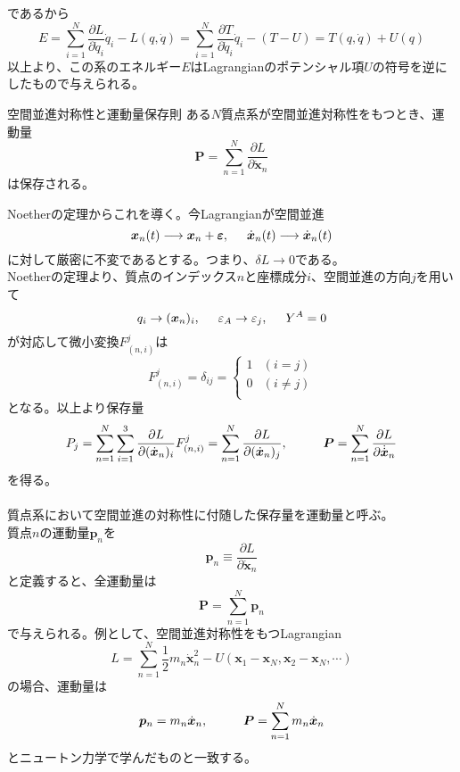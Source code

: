 \documentclass{jsarticle}
\begin{document}
であるから
\[
    E=\sum_{i=1}^{N}\frac{\partial L}{\partial\dot{q}_{i}}\dot{q}_{i}-L(q,\dot{q})
    =\sum_{i=1}^{N}\frac{\partial T}{\partial\dot{q}_{i}}\dot{q}_{i}-(T-U)
    =T(q,\dot{q})+U(q)
\]
以上より、この系のエネルギー\(E\)はLagrangianのポテンシャル項\(U\)の符号を逆にしたもので与えられる。\\
\begin{itembox}[l]{空間並進対称性と運動量保存則}
    ある\(N\)質点系が空間並進対称性をもつとき、運動量
    \[\bm{P}=\sum_{n=1}^{N}\frac{\partial L}{\partial\dot{\bm{x}}_{n}}\]
    は保存される。
\end{itembox}
Noetherの定理からこれを導く。今Lagrangianが空間並進\\
\[\bm{x}_{n}(t)\longrightarrow\bm{x}_{n}+\bm{\varepsilon},\hspace{5mm}
\dot{\bm{x}}_{n}(t)\longrightarrow\dot{\bm{x}}_{n}(t)\]
に対して厳密に不変であるとする。つまり、\(\delta L\to0\)である。\\
Noetherの定理より、質点のインデックス\(n\)と座標成分\(i\)、空間並進の方向\(j\)を用いて
\[q_{i}\to(\bm{x}_{n})_{i},\hspace{5mm}\varepsilon_{A}\to\varepsilon_{j},\hspace{5mm}Y^{A}=0\]
が対応して微小変換\(F_{(n,i)}^{j}\)は
\[F_{(n,i)}^{j}=\delta_{ij}=\begin{cases}
    1 & (i=j)\\
    0 & (i\neq j)\\
\end{cases}\]
となる。以上より保存量
\[P_{j}=\sum_{n=1}^{N}\sum_{i=1}^{3}\frac{\partial L}{\partial(\dot{\bm{x}}_{n})_{i}}F_{(n,i)}^{j}
=\sum_{n=1}^{N}\frac{\partial L}{\partial(\dot{\bm{x}}_{n})_{j}},\hspace{10mm}\bm{P}
=\sum_{n=1}^{N}\frac{\partial L}{\partial\dot{\dot{\bm{x}}}_{n}}\]
を得る。\\
\\
質点系において空間並進の対称性に付随した保存量を運動量と呼ぶ。\\
質点\(n\)の運動量\(\bm{p}_{n}\)を
\[\bm{p}_{n}\equiv\frac{\partial L}{\partial\dot{\bm{x}}_{n}}\]
と定義すると、全運動量は
\[\bm{P}=\sum_{n=1}^{N}\bm{p}_{n}\]
で与えられる。例として、空間並進対称性をもつLagrangian
\[L=\sum_{n=1}^{N}\frac{1}{2}m_{n}\dot{\bm{x}}_{n}^{2}-U(\bm{x}_{1}-\bm{x}_{N},\bm{x}_{2}-\bm{x}_{N},\cdots)\]
の場合、運動量は
\[\bm{p}_{n}=m_{n}\dot{\bm{x}}_{n},\hspace{10mm}\bm{P}=\sum_{n=1}^{N}m_{n}\dot{\bm{x}}_{n}\]
とニュートン力学で学んだものと一致する。\\
\end{document}
